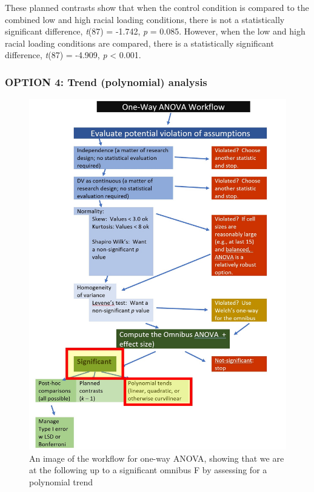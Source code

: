 \documentclass[
  11pt,
]{book}
\begin{document}
These planned contrasts show that when the control condition is compared to the combined low and high racial loading conditions, there is not a statistically significant difference, \emph{t}(87) = -1.742, \emph{p} = 0.085. However, when the low and high racial loading conditions are compared, there is a statistically significant difference, \emph{t}(87) = -4.909, \emph{p} \textless{} 0.001.

\hypertarget{option-4-trend-polynomial-analysis}{%
\subsubsection{OPTION 4: Trend (polynomial) analysis}\label{option-4-trend-polynomial-analysis}}

\begin{figure}
\centering
\includegraphics{images/oneway/OnewayWrkFlw_poly.jpg}
\caption{An image of the workflow for one-way ANOVA, showing that we are at the following up to a significant omnibus F by assessing for a polynomial trend}
\end{figure}
\end{document}
